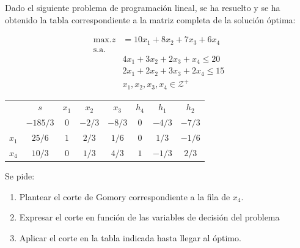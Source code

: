 Dado el siguiente problema de programación lineal, se ha resuelto y se ha obtenido la tabla correspondiente a la matriz completa de la solución óptima:

\begin{align*}
    \text{max.} z &= 10x_1 + 8x_2 + 7x_3 + 6x_4 \\
    \text{s.a. }& \\
    &4x_1 + 3x_2 + 2x_3 + x_4 \le 20 \\
    &2x_1 + 2x_2 + 3x_3 + 2x_4 \le 15 \\
    &x_1, x_2, x_3, x_4 \in  \mathcal{Z^+}
\end{align*}

 \begin{center}
    \begin{tabular}{c|c|cccccc|}
     & $s$ & $x_1$ & $x_2$ & $x_3$ & $h_4$ &$h_1$ & $h_2$ \\
     & $-185/3$ & $0$ & $-2/3$ & $-8/3$ & $0$ &$-4/3$ & $-7/3$  \\
    \hline
    $x_1$ & $25/6$  & $1$ & $2/3$ & $1/6$ & $0$ & $1/3$ & $-1/6$\\
    $x_4$ & $10/3$  & $0$ & $1/3$ & $4/3$ & $1$ &  $-1/3$ &$2/3$ \\
    \hline
    \end{tabular}
\end{center}

Se pide:
\begin{enumerate}
    \item Plantear el corte de Gomory correspondiente a la fila de $x_4$.
    \item Expresar el corte en función de las variables de decisión del problema
    \item Aplicar el corte en la tabla indicada hasta llegar al óptimo.
\end{enumerate}